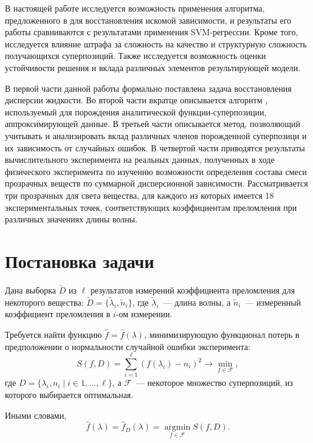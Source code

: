 \documentclass[12pt,a4paper]{article}
\begin{document}
В настоящей работе исследуется возможность применения алгоритма, предложенного в
\cite{Rudoy13} для восстановления искомой зависимости, и результаты его работы
сравниваются с результатами применения SVM-регрессии. Кроме того, исследуется
влияние штрафа за сложность на качество и структурную сложность получающихся
суперпозиций. Также исследуется возможность оценки устойчивости решения и вклада
различных элементов результирующей модели.

В первой части данной работы формально поставлена задача восстановления
дисперсии жидкости. Во второй части вкратце описывается алгоритм \cite{Rudoy13},
используемый для порождения аналитической функции-суперпозиции, аппроксимирующей
данные. В третьей части описывается метод, позволяющий учитывать и анализировать
вклад различных членов порожденной суперпозици и их зависимость от случайных
ошибок. В четвертой части приводятся результаты вычислительного
эксперимента на реальных данных, полученных в ходе физического эксперимента по
изучению возможности определения состава смеси прозрачных веществ по
суммарной дисперсионной зависимости. Рассматривается три прозрачных для света
вещества, для каждого из которых имеется 18 экспериментальных точек,
соответствующих коэффициентам преломления при различных значениях длины волны.

\section{Постановка задачи}

Дана выборка $\tilde{D}$ из $\ell$ результатов измерений коэффициента преломления для некоторого
вещества: $\tilde{D} = \{ \tilde{\lambda}_i, \tilde{n}_i \}$, где $\tilde{\lambda}_i$~--- длина волны,
а $\tilde{n}_i$~--- измеренный коэффициент преломления в $i$-ом измерении.

Требуется найти функцию $\hat{f} = \hat{f}(\lambda)$, минимизирующую функционал
потерь в предположении о нормальности случайной ошибки эксперимента:
\begin{equation}
  S(f, D) = \sum_{i = 1}^\ell (f(\lambda_i) - n_i)^2 \rightarrow \min_{f \in \mathcal{F}},
  \label{eq:s}
\end{equation}
где $D = \{ \lambda_i, n_i \mid i \in 1, \dots, \ell \}$, а $\mathcal{F}$~---
некоторое множество суперпозиций, из которого выбирается оптимальная.

Иными словами,
\begin{equation}
  \hat{f}(\lambda) = \hat{f}_D(\lambda) = \mathop{\arg \min}\limits_{f \in \mathcal{F}} S(f, D).
  \label{eq:fhat}
\end{equation}
\end{document}
